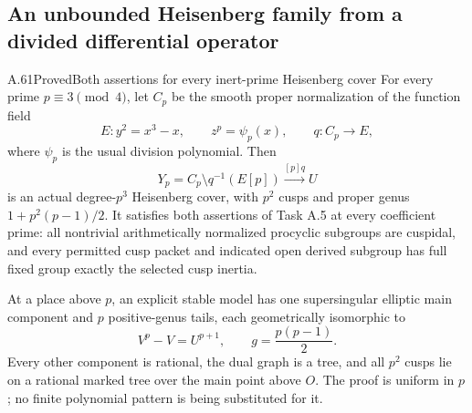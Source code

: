 \subsection{An unbounded Heisenberg family from a divided differential operator}

\begin{statement}{A.61}{Proved}{Both assertions for every inert-prime Heisenberg cover}
For every prime \(p\equiv3\pmod4\), let \(C_p\) be the
smooth proper normalization of the function field
\[
 E:y^2=x^3-x,\qquad z^p=\psi_p(x),
 \qquad q:C_p\longrightarrow E,
                                                        \tag{A.61.1}
\]
where \(\psi_p\) is the usual division polynomial. Then
\[
 Y_p=C_p\setminus q^{-1}(E[p])
           \xrightarrow{[p]q}U
                                                        \tag{A.61.2}
\]
is an actual degree-\(p^3\) Heisenberg cover, with
\(p^2\) cusps and proper genus
\(1+p^2(p-1)/2\). It satisfies both assertions of
Task A.5 at every coefficient prime: all nontrivial
arithmetically normalized procyclic subgroups are
cuspidal, and every permitted cusp packet and indicated
open derived subgroup has full fixed group exactly
the selected cusp inertia.

At a place above \(p\), an explicit stable model has
one supersingular elliptic main component and \(p\)
positive-genus tails, each geometrically isomorphic to
\[
                         V^p-V=U^{p+1},
 \qquad g=\frac{p(p-1)}2.                              \tag{A.61.3}
\]
Every other component is rational, the dual graph is
a tree, and all \(p^2\) cusps lie on a rational marked
tree over the main point above \(O\). The proof is
uniform in \(p\); no finite polynomial pattern is
being substituted for it.
\end{statement}


